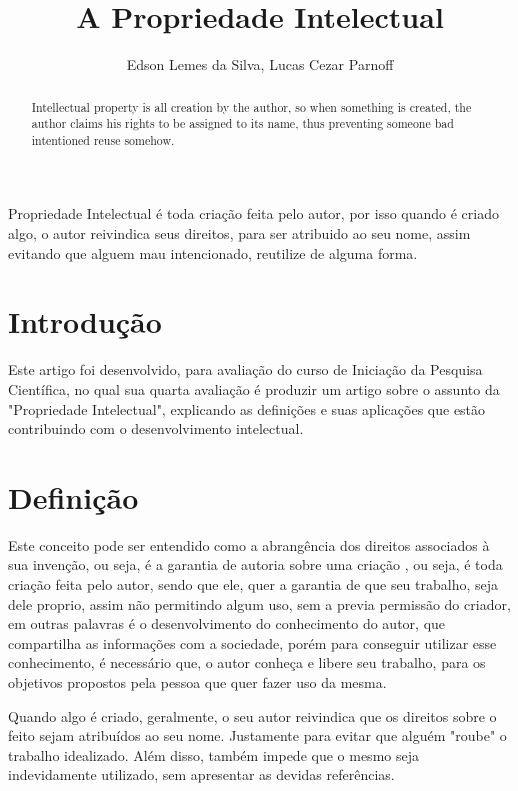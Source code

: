 \documentclass[12pt]{article}
\title{A Propriedade Intelectual}
\author{Edson Lemes da Silva\inst{1}, Lucas Cezar Parnoff\inst{1}  }
\begin{document}
 

\maketitle

\begin{abstract}
  Intellectual property is all creation by the author, so when something is created, the author claims his rights to be assigned to its name, thus preventing someone bad intentioned reuse somehow.
\end{abstract}
     
\begin{resumo} 
  Propriedade Intelectual é toda criação feita pelo autor, por isso quando é criado algo, o autor reivindica seus direitos, para ser atribuido ao seu nome, assim evitando que alguem mau intencionado, reutilize de alguma forma. 
\end{resumo}

\section{Introdução}\label{sec:introducao}

Este artigo foi desenvolvido, para avaliação
do curso de Iniciação da Pesquisa Científica, no qual
sua quarta avaliação é produzir um artigo sobre o assunto da
"Propriedade Intelectual", explicando as definições e
suas aplicações que estão contribuindo com
o desenvolvimento intelectual.

\section{Definição}\label{sec:conteudo}

Este conceito pode ser entendido como a abrangência  dos direitos associados à sua invenção, ou seja, é a garantia de autoria sobre uma criação \cite{UFAL}, ou seja, é toda criação feita pelo autor, sendo que ele, quer a garantia de que seu trabalho, seja dele proprio, assim não permitindo algum uso, sem a previa permissão do criador, em outras palavras é o desenvolvimento do conhecimento do autor, que compartilha as informações com a sociedade, porém para conseguir utilizar esse conhecimento, é necessário que, o autor conheça e libere seu trabalho, para os objetivos propostos pela pessoa que quer fazer uso da mesma. 

Quando algo é criado, geralmente, o seu autor reivindica que os direitos sobre o feito sejam atribuídos ao seu nome. Justamente para evitar que alguém "roube" o trabalho idealizado. Além disso, também impede que o mesmo seja indevidamente utilizado, sem apresentar as devidas referências.
\end{document}
